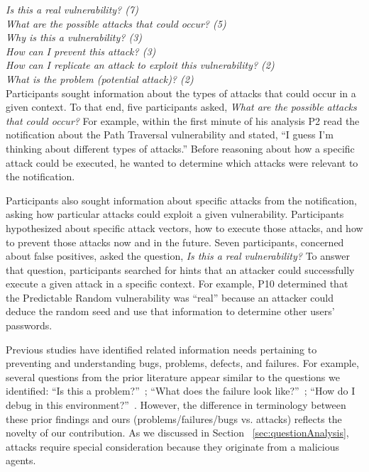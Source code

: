 \documentclass[10pt,journal,compsoc]{IEEEtran}
\begin{document}
\noindent\emph{Is this a real vulnerability? (7)} \\
\emph{What are the possible attacks that could occur? (5)} \\
\emph{Why is this a vulnerability? (3)} \\
\emph{How can I prevent this attack? (3)} \\
\emph{How can I replicate an attack to exploit this vulnerability? (2)} \\
\emph{What is the problem (potential attack)? (2)} 
\\

Participants sought information about the types of attacks that could occur in a given context.
To that end, five participants asked, \textit{What are the possible attacks that could occur?}
For example, within the first minute of his analysis P2 read the notification about the Path Traversal vulnerability and stated, ``I guess I'm thinking about different types of attacks.''
Before reasoning about how a specific attack could be executed, he wanted to determine which attacks were relevant to the notification.

Participants also sought information about specific attacks from the notification, asking how particular attacks could exploit a given vulnerability.
Participants hypothesized about specific attack vectors, how to execute those attacks, and how to prevent those attacks now and in the future.
Seven participants, concerned about false positives, asked the question, \textit{Is this a real vulnerability?} 
To answer that question, participants searched for hints that an attacker could successfully execute a given attack in a specific context. 
For example, P10 determined that the Predictable Random vulnerability was ``real'' because an attacker could deduce the random seed and use that information to determine other users' passwords. 

Previous studies have identified related information needs pertaining to preventing and understanding bugs, problems, defects, and failures.
For example, several questions from the prior literature appear similar to the questions we identified: ``Is this a problem?''~\cite{Ko:2007:information}; ``What does the failure look like?''~\cite{Ko:2007:information}; ``How do I debug in this environment?''~\cite{latoza2010hard}.
However, the difference in terminology between these prior findings and ours (problems/failures/bugs vs. attacks) reflects the novelty of our contribution.
As we discussed in Section ~\ref{sec:questionAnalysis}, attacks require special consideration because they originate from a malicious agents. 
	
\end{document}
